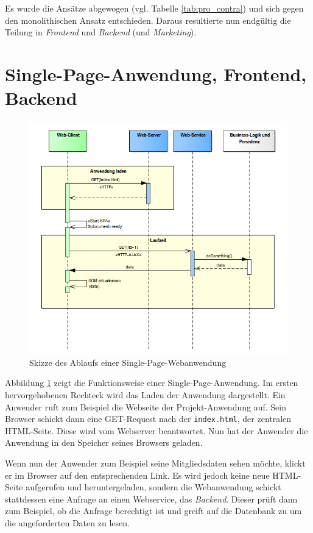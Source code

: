 \documentclass[a4paper, 11pt]{article}
\begin{document}
Es wurde die Ansätze abgewogen (vgl. Tabelle \ref{tab:pro_contra}) und sich
gegen den monolithischen Ansatz entschieden. Daraus resultierte nun endgültig
die Teilung in \emph{Frontend} und \emph{Backend} (und \emph{Marketing}).

\section{Single-Page-Anwendung, Frontend, Backend}

\begin{figure}[htpb]
    \centering
    \includegraphics[width=\textwidth]{images/SPA_Start.png}
    \caption{Skizze des Ablaufs einer Single-Page-Webanwendung}
    \label{fig:spa_start}
\end{figure}

Abbildung \ref{fig:spa_start} zeigt die Funktionsweise einer
Single-Page-Anwendung. Im ersten hervorgehobenen Rechteck wird das Laden der
Anwendung dargestellt. Ein Anwender ruft zum Beispiel die Webseite der
Projekt-Anwendung auf. Sein Browser schickt dann eine GET-Request nach der
\texttt{index.html}, der zentralen HTML-Seite. Diese wird vom Webserver
beantwortet. Nun hat der Anwender die Anwendung in den Speicher seines Browsers
geladen. 

Wenn nun der Anwender zum Beispiel seine Mitgliedsdaten sehen möchte, klickt er
im Browser auf den entsprechenden Link. Es wird jedoch keine neue HTML-Seite
aufgerufen und heruntergeladen, sondern die Webanwendung schickt stattdessen
eine Anfrage an einen Webservice, das \emph{Backend}. Dieser prüft dann zum
Beispiel, ob die Anfrage berechtigt ist und greift auf die Datenbank zu um die
angeforderten Daten zu lesen.
\end{document}
